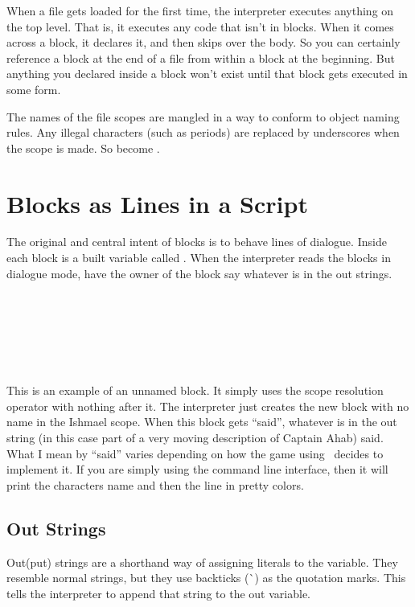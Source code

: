 When a file gets loaded for the first time, the interpreter executes anything on the top level.  That is, it executes any code that isn't in blocks.  When it comes across a block, it declares it, and then skips over the body.  So you can certainly reference a block at the end of a file from within a block at the beginning.  But anything you declared inside a block won't exist until that block gets executed in some form.

The names of the file scopes are mangled in a way to conform to object naming rules.  Any illegal characters (such as periods) are replaced by underscores when the scope is made.  So  become .

\section{Blocks as Lines in a Script}

The original and central intent of blocks is to behave lines of dialogue.  Inside each block is a built variable called .  When the interpreter reads the blocks in dialogue mode, have the owner of the block say whatever is in the out strings.

\begin{SSCodeBox}
 \\
\scitea{} \\
\scitea{\{} \\
\scitea{ =} \\
\scitea{;} \\
\scitea{\}}
\end{SSCodeBox}

This is an example of an unnamed block.  It simply uses the scope resolution operator with nothing after it.  The interpreter just creates the new block with no name in the Ishmael scope.  When this block gets ``said'', whatever is in the out string (in this case part of a very moving description of Captain Ahab) said.  What I mean by ``said'' varies depending on how the game using \SSquared\ decides to implement it.  If you are simply using the command line interface, then it will print the characters name and then the line in pretty colors.

\subsection{Out Strings}
Out(put) strings are a shorthand way of assigning literals to the  variable.  They resemble normal strings, but they use backticks (\`{}) as the quotation marks.  This tells the interpreter to append that string to the out variable. 

